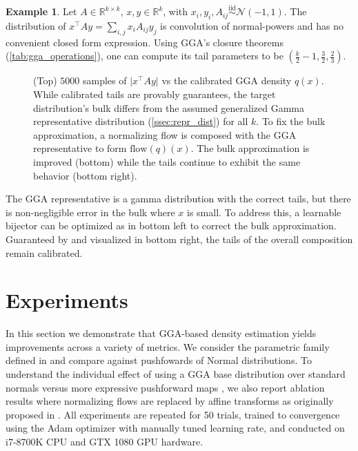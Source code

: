 \documentclass{article}
\theoremstyle{definition}
\newtheorem{example}{Example}
\begin{document}
\begin{example}
	Let $A \in \mathbb{R}^{k \times k}$, $x,y\in\mathbb{R}^k$, with $x_i,y_i,A_{ij} \overset{\text{iid}}{\sim} \mathcal{N}(-1,1)$.
	The distribution of $x^\top A y = \sum_{i,j} x_i A_{ij} y_j$ is convolution of normal-powers \citep{gupta2008analyzing} and has no convenient
	closed form expression.
	Using GGA's closure theorems (\cref{tab:gga_operations}), one can compute
	its tail parameters to be $(\frac{k}{2}-1,\frac{3}{2}, \frac{2}{3})$.

	\begin{figure}[h]
		\centering
		
		
		\caption{(Top) $5000$ samples of $\lvert x^\top A y \rvert$ vs the
		calibrated GGA density $q(x)$. While calibrated tails are provably guarantees,
		the target distribution's bulk differs from the assumed generalized Gamma representative distribution (\cref{ssec:repr_dist}) for all $k$.
		To fix the bulk approximation, a normalizing flow is composed with
		the GGA representative to form $\text{flow}(q)(x)$. The bulk approximation
		is improved (bottom) while the tails continue to exhibit the same
		behavior (bottom right).
		}
		\label{fig:power_normal}
	\end{figure}

	The GGA representative is a gamma distribution with the correct tails, but there is non-negligible error in the bulk where $x$ is small. To address this, a learnable bijector can be
	optimized as in  bottom left to correct the bulk approximation. Guaranteed by  and
	visualized in  bottom right, the tails of the overall composition remain calibrated.
\end{example}

\section{Experiments}\label{sec:experiments}

In this section we demonstrate that GGA-based density estimation yields improvements across a variety of metrics.
We consider the parametric family defined in  and compare against pushfowards of Normal distributions. To understand the individual
effect of using a GGA base distribution over standard normals versus more expressive pushforward maps \citep{durkan2019neural}, we also report ablation results where
normalizing flows are replaced by affine transforms as originally
proposed in \citep{kucukelbir2017automatic}. All experiments are repeated for 50 trials, trained to convergence using the Adam optimizer with manually tuned learning rate,
and conducted on i7-8700K CPU and GTX 1080 GPU hardware.
\end{document}
